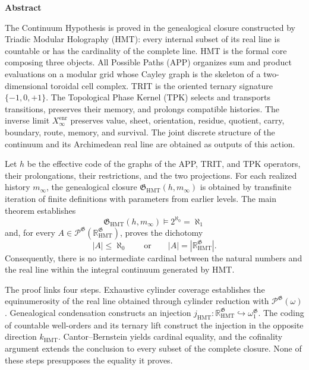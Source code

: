 \begingroup
\begin{center}\textbf{Abstract}\end{center}
\fontsize{9.1}{10.55}\selectfont
\setlength{\parskip}{1.2pt}
\setlength{\abovedisplayskip}{3pt}
\setlength{\belowdisplayskip}{3pt}
The Continuum Hypothesis is proved in the genealogical closure constructed
by Triadic Modular Holography (HMT): every internal subset of its real line is
countable or has the cardinality of the complete line. HMT is the formal core
composing three objects. All Possible Paths (APP) organizes sum and product
evaluations on a modular grid whose Cayley graph is the skeleton of a
two-dimensional toroidal cell complex. TRIT is the oriented ternary signature
\(\{-1,0,+1\}\). The Topological Phase Kernel (TPK) selects and transports
transitions, preserves their memory, and prolongs compatible histories. The
inverse limit \(X_\infty^{\mathrm{enr}}\) preserves value, sheet,
orientation, residue, quotient, carry, boundary, route, memory, and survival.
The joint discrete structure of the continuum and its Archimedean real line
are obtained as outputs of this action.

Let \(h\) be the effective code of the graphs of the APP, TRIT, and TPK
operators, their prolongations, their restrictions, and the two projections.
For each realized history \(m_\infty\), the genealogical closure
\(\mathfrak G_{\mathrm{HMT}}(h,m_\infty)\) is obtained by transfinite
iteration of finite definitions with parameters from earlier levels. The main
theorem establishes
\[
 \boxed{\mathfrak G_{\mathrm{HMT}}(h,m_\infty)
 \models 2^{\aleph_0}=\aleph_1}
\]
and, for every
\(A\in\mathcal P^{\mathfrak G}
(\mathbb R_{\mathrm{HMT}}^{\mathfrak G})\), proves the dichotomy
\[
 |A|\leq\aleph_0
 \qquad\text{or}\qquad
 |A|=|\mathbb R_{\mathrm{HMT}}^{\mathfrak G}|.
\]
Consequently, there is no intermediate cardinal between the natural numbers
and the real line within the integral continuum generated by HMT.

The proof links four steps. Exhaustive cylinder coverage establishes the
equinumerosity of the real line obtained through cylinder reduction with
\(\mathcal P^{\mathfrak G}(\omega)\). Genealogical
condensation constructs an injection
\(j_{\mathrm{HMT}}:\mathbb R_{\mathrm{HMT}}^{\mathfrak G}
\hookrightarrow\omega_1^{\mathfrak G}\). The coding of countable well-orders
and its ternary lift construct the injection in the opposite direction
\(k_{\mathrm{HMT}}\). Cantor--Bernstein yields cardinal equality, and the
cofinality argument extends the conclusion to every subset of the complete
closure. None of these steps presupposes the equality it proves.

